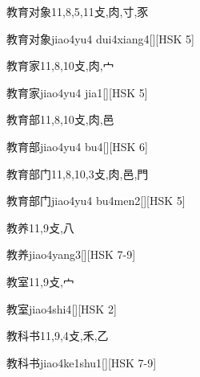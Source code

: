\begin{Entry}{教育对象}{11,8,5,11}{⽁,⾁,⼨,⾗}
  \begin{Phonetics}{教育对象}{jiao4yu4 dui4xiang4}[][HSK 5]
  \end{Phonetics}
\end{Entry}

\begin{Entry}{教育家}{11,8,10}{⽁,⾁,⼧}
  \begin{Phonetics}{教育家}{jiao4yu4 jia1}[][HSK 5]
  \end{Phonetics}
\end{Entry}

\begin{Entry}{教育部}{11,8,10}{⽁,⾁,⾢}
  \begin{Phonetics}{教育部}{jiao4yu4 bu4}[][HSK 6]
  \end{Phonetics}
\end{Entry}

\begin{Entry}{教育部门}{11,8,10,3}{⽁,⾁,⾢,⾨}
  \begin{Phonetics}{教育部门}{jiao4yu4 bu4men2}[][HSK 5]
  \end{Phonetics}
\end{Entry}

\begin{Entry}{教养}{11,9}{⽁,⼋}
  \begin{Phonetics}{教养}{jiao4yang3}[][HSK 7-9]
  \end{Phonetics}
\end{Entry}

\begin{Entry}{教室}{11,9}{⽁,⼧}
  \begin{Phonetics}{教室}{jiao4shi4}[][HSK 2]
  \end{Phonetics}
\end{Entry}

\begin{Entry}{教科书}{11,9,4}{⽁,⽲,⼄}
  \begin{Phonetics}{教科书}{jiao4ke1shu1}[][HSK 7-9]
  \end{Phonetics}
\end{Entry}

